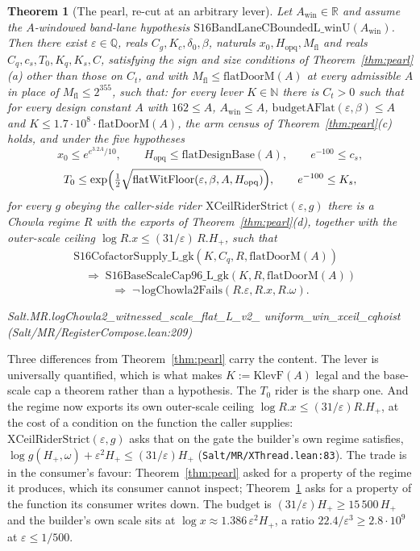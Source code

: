 \documentclass[11pt]{amsart}
\newcommand{\leanname}[1]{\par{\noindent\small\ttfamily\raggedright #1\par}}
\newcommand{\leaninline}[1]{{\small\texttt{#1}}}
\newtheorem{theorem}{Theorem}[section]
\theoremstyle{remark}
\begin{document}
\begin{theorem}[The pearl, re-cut at an arbitrary
lever]\label{thm:pearl-recut}
Let $A_{\mathrm{win}} \in \mathbb{R}$ and assume the $A$-windowed band-lane
hypothesis $\mathrm{S16BandLaneCBoundedL\_winU}(A_{\mathrm{win}})$. Then there
exist $\varepsilon \in \mathbb{Q}$, reals $C_g, K_c, \delta_0, \beta$, naturals
$x_0, H_{\mathrm{opq}}, M_{\mathrm{fl}}$ and reals
$C_q, c_s, T_0, K_q, K_s, C$, satisfying the sign and size conditions of
Theorem~\ref{thm:pearl}(a) other than those on $C_t$, and with
$M_{\mathrm{fl}} \le \mathrm{flatDoorM}(A)$ at every admissible $A$ in place of
$M_{\mathrm{fl}} \le 2^{355}$, such that: for every lever $K \in \mathbb{N}$
there is
$C_t > 0$ such that for every design constant $A$ with $162 \le A$,
$A_{\mathrm{win}} \le A$, $\mathrm{budgetAFlat}(\varepsilon,\beta) \le A$ and
$K \le 1.7\cdot10^{8}\cdot\mathrm{flatDoorM}(A)$, the arm census
of Theorem~\ref{thm:pearl}(c) holds, and under the five hypotheses
\[
x_0 \le e^{e^{3.2A}/10},\qquad
H_{\mathrm{opq}} \le \mathrm{flatDesignBase}(A),\qquad
e^{-100} \le c_s,
\]
\[
T_0 \le \exp\Bigl(\tfrac12\sqrt{\mathrm{flatWitFloor}
(\varepsilon,\beta,A,H_{\mathrm{opq}})}\Bigr),
\qquad
e^{-100} \le K_s,
\]
for every $g$ obeying the caller-side rider
$\mathrm{XCeilRiderStrict}(\varepsilon, g)$ there is a Chowla regime $R$ with
the exports of Theorem~\ref{thm:pearl}(d), together with the outer-scale
ceiling $\log R.x \le (31/\varepsilon)\,R.H_+$, such that
\[
\begin{aligned}
&\mathrm{S16CofactorSupply\_L\_gk}(K, C_q, R, \mathrm{flatDoorM}(A))\\
&\quad\Rightarrow\;
\mathrm{S16BaseScaleCap96\_L\_gk}(K, R, \mathrm{flatDoorM}(A))
\end{aligned}
\]
\[
\Rightarrow\;
\lnot\,\mathrm{logChowla2Fails}(R.\varepsilon, R.x, R.\omega).
\]
\leanname{Salt.MR.\allowbreak logChowla2\_witnessed\_scale\_flat\_L\_v2\_%
\allowbreak uniform\_win\_xceil\_cqhoist
(Salt/\allowbreak MR/\allowbreak RegisterCompose.lean:209)}
\end{theorem}

Three differences from Theorem~\ref{thm:pearl} carry the content. The lever is
universally quantified, which is what makes $K := \mathrm{KlevF}(A)$ legal and
the base-scale cap a theorem rather than a hypothesis. The $T_0$ rider is the
sharp one. And the regime now exports its own outer-scale ceiling
$\log R.x \le (31/\varepsilon)R.H_+$, at the cost of a condition on the
function the caller supplies: $\mathrm{XCeilRiderStrict}(\varepsilon,g)$ asks
that on the gate the builder's own regime satisfies, $\log g(H_+,\omega) +
\varepsilon^{2}H_+ \le (31/\varepsilon)H_+$
(\leaninline{Salt/MR/XThread.lean:83}). The trade is in the consumer's favour:
Theorem~\ref{thm:pearl} asked for a property of the regime it produces, which
its consumer cannot inspect; Theorem~\ref{thm:pearl-recut} asks for a property
of the function its consumer writes down. The budget is
$(31/\varepsilon)H_+ \ge 15\,500\,H_+$ and the builder's own scale sits at
$\log x \approx 1.386\,\varepsilon^{2}H_+$, a ratio $22.4/\varepsilon^{3} \ge
2.8\cdot10^{9}$ at $\varepsilon \le 1/500$.
\end{document}
